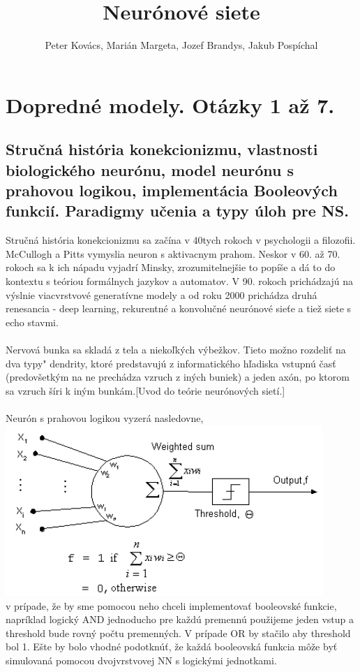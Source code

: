 \documentclass{article}
\title{ Neurónové siete}
\author{Peter Kovács, Marián Margeta, Jozef Brandys, Jakub Pospíchal} %
\date{ }
\numberwithin{equation}{section} %
\begin{document}
\maketitle
\tableofcontents
\newpage
\section{Dopredné modely. Otázky 1 až 7. }
\subsection{Stručná história konekcionizmu, vlastnosti biologického neurónu, model neurónu s prahovou logikou,
implementácia Booleových funkcií. Paradigmy učenia a typy úloh pre NS.}
Stručná história konekcionizmu sa začína v 40tych rokoch v psychologii a filozofii. McCullogh a Pitts vymyslia neuron s aktivacnym prahom. Neskor v 60. až 70. rokoch sa k ich nápadu vyjadrí Minsky, zrozumitelnejšie to popíše a dá to do kontextu s teóriou formálnych jazykov a automatov. V 90. rokoch prichádzajú na výslnie viacvrstvové generatívne modely a od roku 2000 prichádza druhá renesancia - deep learning, rekurentné a konvolučné neurónové sieťe a tiež siete s echo stavmi.
\\\\
Nervová bunka sa skladá z tela a niekoľkých výbežkov. Tieto možno rozdeliť na dva typy" dendrity, ktoré predstavujú z informatického hľadiska vstupnú časť (predovšetkým na ne prechádza vzruch z iných buniek) a jeden axón, po ktorom sa vzruch šíri k iným bunkám.[Uvod do teórie neurónových sietí.]
\\\\
Neurón s prahovou logikou vyzerá nasledovne, \\
\includegraphics[width=12cm]{imgs/threshold_neuron}\\
v prípade, že by sme pomocou neho chceli implementovať booleovské funkcie, napríklad logický AND jednoducho pre každú premennú použijeme jeden vstup a threshold bude rovný počtu premenných. V prípade OR by stačilo aby threshold bol 1. Ešte by bolo vhodné podotknúť, že každá booleovská funkcia môže byť simulovaná pomocou dvojvrstvovej NN s logickými jednotkami.
\end{document}
